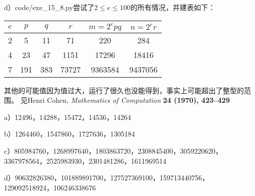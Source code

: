 d）code/exe\_15\_8.py尝试了$2\le e\le 100$的所有情况，并建表如下：
\begin{center}
\begin{tabular}{c|c|c|c|c|c}
\hline
$e$ & $p$ & $q$ & $r$ & $m=2^epq$ & $n=2^er$ \\
\hline
2 & 5 & 11 & 71 & 220 & 284 \\
\hline
4 & 23 & 47 & 1151 & 17296 & 18416 \\
\hline
7 & 191 & 383 & 73727 & 9363584 & 9437056 \\
\hline
\end{tabular}
\end{center}
其他的可能值因为值过大，运行了很久也没能得到，事实上可能超出了整型的范围。
%
\exercise 见Henri Cohen, \emph{Mathematics of Computation} \bf{24} (1970), 423--429\par
a）12496，14288，15472，14536，14264\par
b）1264460，1547860，1727636，1305184\par
c）805984760，1268997640，1803863720，2308845400，3059220620，3367978564，2525983930，2301481286，1611969514\par
d）90632826380，101889891700，127527369100，159713440756，129092518924，106246338676
